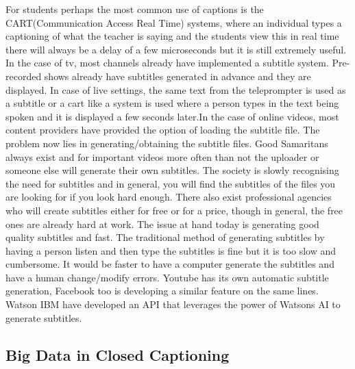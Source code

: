\documentclass[sigconf]{acmart}
\begin{document}
For students perhaps the most common use of captions is the CART(Communication Access Real Time) systems, where an individual types a captioning of what the teacher is saying and the students view this in real time there will always be a delay of a few microseconds but it is still extremely useful. In the case of tv, most channels already have implemented a subtitle system. Pre-recorded shows already have subtitles generated in advance and they are displayed. In case of live settings, the same text from the teleprompter is used as a subtitle or a cart like a system is used where a person types in the text being spoken and it is displayed a few seconds later.In the case of online videos, most content providers have provided the option of loading the subtitle file. The problem now lies in generating/obtaining the subtitle files. Good Samaritans always exist and for important videos more often than not the uploader or someone else will generate their own subtitles. The society is slowly recognising the need for subtitles and in general, you will find the subtitles of the files you are looking for if you look hard enough. There also exist professional agencies who will create subtitles either for free or for a price, though in general, the free ones are already hard at work. 
\newline
The issue at hand today is generating good quality subtitles and fast. The traditional method of generating subtitles by having a person listen and then type the subtitles is fine but it is too slow and cumbersome. It would be faster to have a computer generate the subtitles and have a human change/modify errors. Youtube has its own automatic subtitle generation, Facebook too is developing a similar feature on the same lines. Watson IBM have developed an API that leverages the power of Watsons AI to generate subtitles.

\subsection{Big Data in Closed Captioning}
\end{document}
